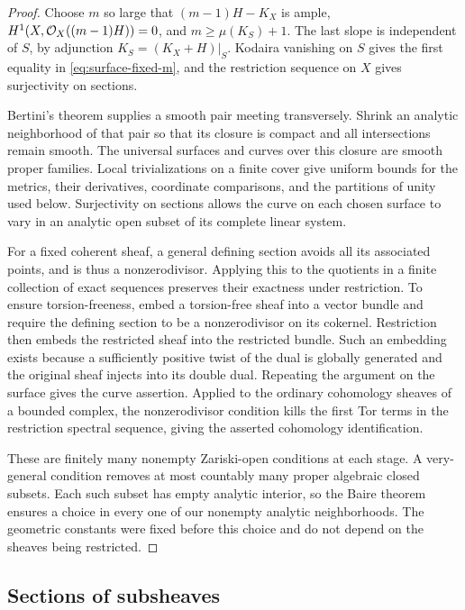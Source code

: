 \begin{proof}
Choose $m$ so large that $(m-1)H-K_X$ is ample,
$H^1(X,\mathcal O_X((m-1)H))=0$, and $m\ge\mu(K_S)+1$.
The last slope is independent of $S$, by adjunction
$K_S=(K_X+H)|_S$.  Kodaira vanishing on $S$
\cite[Chapter~VII, Theorem~3.3]{DemaillyCADG} gives the first equality
in \eqref{eq:surface-fixed-m}, and the restriction sequence on $X$
gives surjectivity on sections.

Bertini's theorem supplies a smooth pair meeting transversely.
Shrink an analytic neighborhood of that pair so that its closure is
compact and all intersections remain smooth.  The universal
surfaces and curves over this closure are smooth proper families.
Local trivializations on a finite cover give uniform bounds for
the metrics, their derivatives, coordinate comparisons, and the
partitions of unity used below.  Surjectivity on sections allows the
curve on each chosen surface to vary in an analytic open subset of
its complete linear system.

For a fixed coherent sheaf, a general defining section avoids all
its associated points, and is thus a nonzerodivisor.  Applying this
to the quotients in a finite collection of exact sequences preserves
their exactness under restriction.  To ensure torsion-freeness,
embed a torsion-free sheaf into a vector bundle and require the
defining section to be a nonzerodivisor on its cokernel.  Restriction
then embeds the restricted sheaf into the restricted bundle.  Such
an embedding exists because a sufficiently positive twist of the
dual is globally generated and the original sheaf injects into its
double dual.  Repeating the argument on the surface gives the curve
assertion.  Applied to the ordinary cohomology sheaves of a bounded
complex, the nonzerodivisor condition kills the first Tor terms in
the restriction spectral sequence, giving the asserted cohomology
identification.

These are finitely many nonempty Zariski-open conditions at each
stage.  A very-general condition removes at most countably many
proper algebraic closed subsets.  Each such subset has empty
analytic interior, so the Baire theorem ensures a choice in every
one of our nonempty analytic neighborhoods.  The geometric
constants were fixed before this choice and do not depend on the
sheaves being restricted.
\end{proof}

\subsection{Sections of subsheaves}

